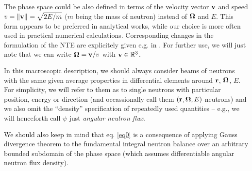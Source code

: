 \begin{remark}
	The phase space could be also defined in terms of the velocity vector $\bv$ and speed $v = \norm{\bv} = \sqrt{2E/m}$
	($m$ being the mass of neutron) instead of $\bomega$ and $E$. 
	This form appears to be preferred in analytical works, while our choice is more often used in practical numerical
	calculations.
	Corresponding changes in the formulation of the NTE are
	explicitely given e.g. in \cite[Chap. XXI, eqns. (1.1) and (1.2)]{DautrayLions}. For further use, we will just note
	that we can write $\bomega = \bv / v$ with $\bv\in\R[3]$.
\end{remark} 
\begin{remark}
	In this macroscopic description, we should always consider beams of neutrons with the same given average properties in
	differential elements around $\br$, $\bomega$, $E$. For simplicity, we will refer to them as to single neutrons with
	particular position, energy or direction (and occassionally call them $(\br,\bomega,E)$-neutrons) and we also omit the
	``density'' specification of repeatedly used quantities -- e.g., we will henceforth call $\psi$ just \textit{angular neutron flux}.
\end{remark} 
\begin{remark}\label{rem:balance}
	We should also keep in mind that eq. \eqref{eq0} is a consequence of applying Gauss divergence
	theorem to the fundamental integral neutron balance over an arbitrary bounded subdomain of the phase space (which
	assumes differentiable angular neutron flux density).
\end{remark}


